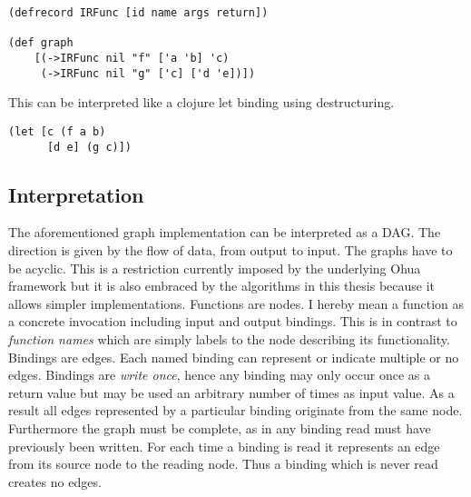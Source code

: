 \begin{verbatim}
(defrecord IRFunc [id name args return])

(def graph
    [(->IRFunc nil "f" ['a 'b] 'c)
     (->IRFunc nil "g" ['c] ['d 'e])])

\end{verbatim}

This can be interpreted like a clojure let binding using destructuring.

\begin{verbatim}
(let [c (f a b)
      [d e] (g c)])
\end{verbatim}

\subsection{Interpretation}

The aforementioned graph implementation can be interpreted as a DAG.
The direction is given by the flow of data, from output to input.
The graphs have to be acyclic.
This is a restriction currently imposed by the underlying Ohua framework but it is also embraced by the algorithms in this thesis because it allows simpler implementations.
Functions are nodes.
I hereby mean a function as a concrete invocation including input and output bindings.
This is in contrast to \textit{function names} which are simply labels to the node describing its functionality.
Bindings are edges.
Each named binding can represent or indicate multiple or no edges.
Bindings are \textit{write once}, hence any binding may only occur once as a return value but may be used an arbitrary number of times as input value.
As a result all edges represented by a particular binding originate from the same node.
Furthermore the graph must be complete, as in any binding read must have previously been written.
For each time a binding is read it represents an edge from its source node to the reading node.
Thus a binding which is never read creates no edges.
